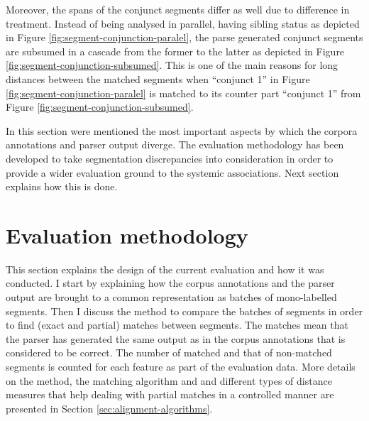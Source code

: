     Moreover, the spans of the conjunct segments differ as well due to difference in treatment. Instead of being analysed in parallel, having sibling status as depicted in Figure \ref{fig:segment-conjunction-paralel}, the parse generated conjunct segments are subsumed in a cascade from the former to the latter as depicted in Figure \ref{fig:segment-conjunction-subsumed}. This is one of the main reasons for long distances between the matched segments when ``conjunct 1'' in Figure \ref{fig:segment-conjunction-paralel} is matched to its counter part ``conjunct 1'' from Figure \ref{fig:segment-conjunction-subsumed}. 
    
    In this section were mentioned the most important aspects by which the corpora annotations and parser output diverge. The evaluation methodology has been developed to take segmentation discrepancies into consideration in order to provide a wider evaluation ground to the systemic associations. Next section explains how this is done.
    
\section{Evaluation methodology}
\label{sec:evaluation-methodology}
    
    This section explains the design of the current evaluation and how it was conducted. I start by explaining how the corpus annotations and the parser output are brought to a common representation as batches of mono-labelled segments. Then I discuss the method to compare the batches of segments in order to find (exact and partial) matches between segments. The matches mean that the parser has generated the same output as in the corpus annotations that is considered to be correct. The number of matched and that of non-matched segments is counted for each feature as part of the evaluation data. More details on the method, the matching algorithm and and different types of distance measures that help dealing with partial matches in a controlled manner are presented in Section \ref{sec:alignment-algorithms}.
    

